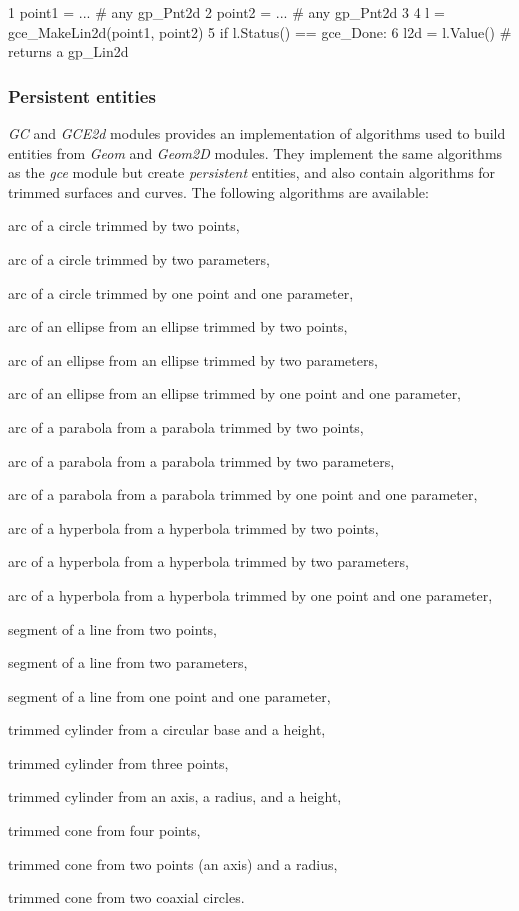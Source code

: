 \begin{DoxyCode}
1 point1 = ... \textcolor{comment}{# any gp\_Pnt2d}
2 point2 = ... \textcolor{comment}{# any gp\_Pnt2d}
3 
4 l = gce\_MakeLin2d(point1, point2)
5 \textcolor{keywordflow}{if} l.Status() == gce\_Done:
6  l2d = l.Value() \textcolor{comment}{# returns a gp\_Lin2d}
\end{DoxyCode}
\hypertarget{occt_user_guides__modeling_data_occt_modat_1_2_2}{}\subsubsection{Persistent entities}\label{occt_user_guides__modeling_data_occt_modat_1_2_2}
{\itshape GC} and {\itshape G\+C\+E2d} modules provides an implementation of algorithms used to build entities from {\itshape Geom} and {\itshape Geom2D} modules. They implement the same algorithms as the {\itshape gce} module but create {\itshape persistent} entities, and also contain algorithms for trimmed surfaces and curves. The following algorithms are available\+:
\begin{DoxyItemize}
\item arc of a circle trimmed by two points,
\item arc of a circle trimmed by two parameters,
\item arc of a circle trimmed by one point and one parameter,
\item arc of an ellipse from an ellipse trimmed by two points,
\item arc of an ellipse from an ellipse trimmed by two parameters,
\item arc of an ellipse from an ellipse trimmed by one point and one parameter,
\item arc of a parabola from a parabola trimmed by two points,
\item arc of a parabola from a parabola trimmed by two parameters,
\item arc of a parabola from a parabola trimmed by one point and one parameter,
\item arc of a hyperbola from a hyperbola trimmed by two points,
\item arc of a hyperbola from a hyperbola trimmed by two parameters,
\item arc of a hyperbola from a hyperbola trimmed by one point and one parameter,
\item segment of a line from two points,
\item segment of a line from two parameters,
\item segment of a line from one point and one parameter,
\item trimmed cylinder from a circular base and a height,
\item trimmed cylinder from three points,
\item trimmed cylinder from an axis, a radius, and a height,
\item trimmed cone from four points,
\item trimmed cone from two points (an axis) and a radius,
\item trimmed cone from two coaxial circles.
\end{DoxyItemize}

